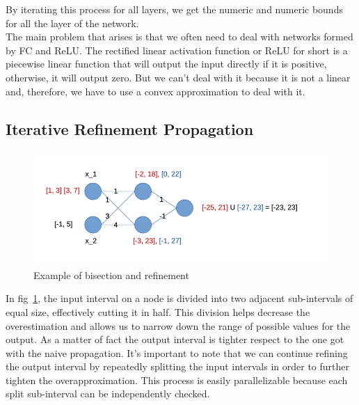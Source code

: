 By iterating this process for all layers, we get the numeric and numeric bounds for all the layer of the network.\\
The main problem that arises is that we often need to deal with networks formed by FC and ReLU. The rectified linear activation function or ReLU for short is a piecewise linear function that will output the input directly if it is positive, otherwise, it will output zero. But we can't deal with it because it is not a linear and, therefore, we have to use a convex approximation to deal with it.


\subsection{Iterative Refinement Propagation}

\begin{figure}[t]
	\caption{\label{fig:iterative_propagation} Example of bisection and refinement}
	\centering
	\includegraphics[scale=0.6]{"Chapter5/img/bound-propagation/bisection.png"}
\end{figure}

In fig~\ref{fig:iterative_propagation},  the input interval on a node is divided into two adjacent sub-intervals of equal size, effectively cutting it in half. This division helps decrease the overestimation and allows us to narrow down the range of possible values for the output. As a matter of fact the output interval is tighter respect to the one got with the naive propagation. It's important to note that we can continue refining the output interval by repeatedly splitting the input intervals in order to further tighten the overapproximation. This process is easily parallelizable because each split sub-interval can be independently checked.


    

	

	




